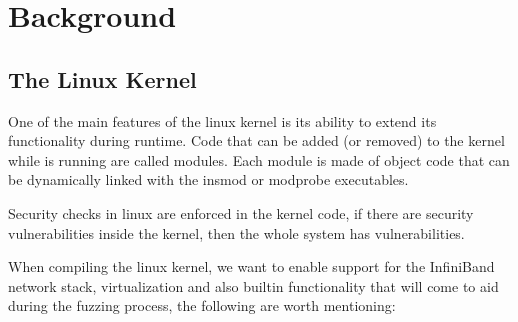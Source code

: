 \section{Background}


\subsection{The Linux Kernel}

One of the main features of the linux kernel is its ability to extend 
its functionality during runtime. Code that can be added (or removed) to the kernel
while is running are called modules. Each module is made of object code that can
be dynamically linked with the insmod or modprobe executables\cite{ldd3}. 

Security checks in linux are enforced in the kernel code, if there are security vulnerabilities inside
the kernel, then the whole system has vulnerabilities.\cite{ldd3}




When compiling the linux kernel, we want to enable support for the InfiniBand network stack, virtualization and 
also builtin functionality that will come to aid during the fuzzing process, the following are worth
mentioning:

